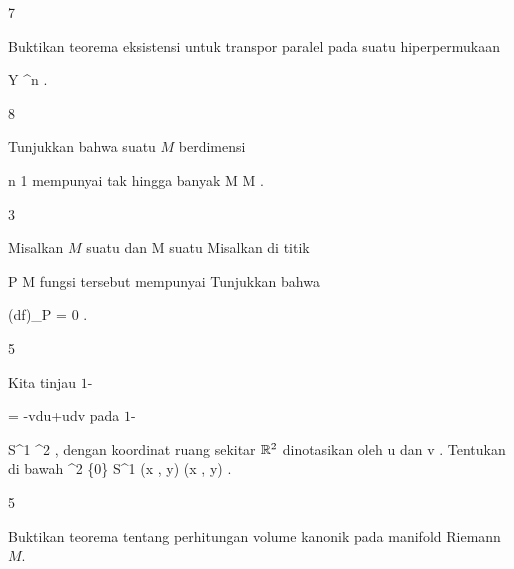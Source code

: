 {7}
{

Buktikan teorema eksistensi untuk transpor paralel pada suatu hiperpermukaan

\mavergleichskette
{\vergleichskette
{ Y
}
{ \subseteq }{ \R^n
}
{  }{
}
{    }{
}
{   }{
}
}
{}{}{.}

}
{} {}

{8}
{

Tunjukkan bahwa suatu
$M$ berdimensi

\mavergleichskette
{\vergleichskette
{ n
}
{ \geq }{ 1
}
{  }{
}
{    }{
}
{   }{
}
}
{}{}{}
mempunyai tak hingga banyak
\maabbdisp {\varphi} { M } { M
} {}
.

}
{} {}

{3}
{

Misalkan $M$ suatu
dan
 { M } {\R
} {}
suatu
Misalkan di titik

\mavergleichskette
{\vergleichskette
{ P
}
{ \in }{ M
}
{  }{
}
{    }{
}
{   }{
}
}
{}{}{}
fungsi tersebut mempunyai
Tunjukkan bahwa

\mavergleichskettedisp
{\vergleichskette
{ (df)_P
}
{ =} { 0
}
{ } {
}
{ } {
}
{ } {
}
}
{}{}{.}

}
{} {}

{5}
{

Kita tinjau
$1$-

\mavergleichskettedisp
{\vergleichskette
{ \omega
}
{ =} { -vdu+udv
}
{ } {
}
{ } {
}
{ } {
}
}
{}{}{}
pada
$1$-

\mavergleichskette
{\vergleichskette
{ S^1
}
{ \subset }{ \R^2
}
{  }{
}
{    }{
}
{   }{
}
}
{}{}{,}
dengan koordinat ruang sekitar ${\mathbb R}^2$ dinotasikan oleh
\mathkor {} {u} {dan} {v} {.}
Tentukan
\mathl{\pi^* \omega}{} di bawah
\maabbeledisp {\pi} {\R^2 \setminus \{0\}} { S^{1}
} {(x , y) } { {  } (x , y)
} {.}

}
{} {}

{5}
{

Buktikan teorema tentang perhitungan volume kanonik pada manifold Riemann $M$.

}
{} {}

